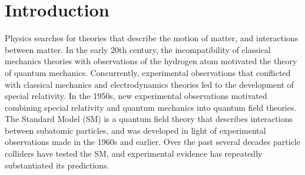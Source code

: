 \chapter{Introduction}
\label{intro_chapter}
%

%
%
%

Physics searches for theories that describe the motion of matter, and interactions between matter.  
In the early 20th century, the incompatibility of classical mechanics theories with 
observations of the hydrogen atom motivated the theory of quantum mechanics.  Concurrently, experimental 
observations that conflicted with classical mechanics and electrodynamics theories led to the development 
of special relativity.  In the 1950s, new experimental observations motivated combining special 
relativity and quantum mechanics into quantum field theories.  The Standard Model (SM) \cite{weinbergSM,salamSM} 
is a quantum field theory that describes interactions between subatomic particles, and was developed 
in light of experimental observations made in the 1960s and earlier.  Over the past 
several decades particle colliders have tested the SM, and experimental evidence has repeatedly 
substantiated its predictions.

